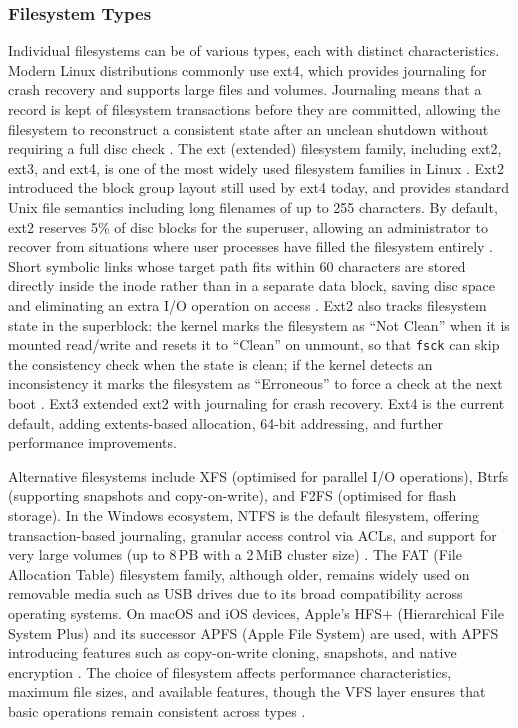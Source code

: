 \subsubsection{Filesystem Types}
\label{FilesystemTypes}

Individual filesystems can be of various types, each with distinct characteristics. Modern Linux distributions commonly use ext4, which provides journaling for crash recovery and supports large files and volumes. Journaling means that a record is kept of filesystem transactions before they are committed, allowing the filesystem to reconstruct a consistent state after an unclean shutdown without requiring a full disc check \parencite{LinuxSAGFilesystems}. The ext (extended) filesystem family, including ext2, ext3, and ext4, is one of the most widely used filesystem families in Linux \parencite{TLDPFilesystems}. Ext2 introduced the block group layout still used by ext4 today, and provides standard Unix file semantics including long filenames of up to 255 characters. By default, ext2 reserves 5\% of disc blocks for the superuser, allowing an administrator to recover from situations where user processes have filled the filesystem entirely \parencite{TLDPFilesystems}. Short symbolic links whose target path fits within 60 characters are stored directly inside the inode rather than in a separate data block, saving disc space and eliminating an extra I/O operation on access \parencite{TLDPFilesystems}. Ext2 also tracks filesystem state in the superblock: the kernel marks the filesystem as ``Not Clean'' when it is mounted read/write and resets it to ``Clean'' on unmount, so that \texttt{fsck} can skip the consistency check when the state is clean; if the kernel detects an inconsistency it marks the filesystem as ``Erroneous'' to force a check at the next boot \parencite{TLDPFilesystems}. Ext3 extended ext2 with journaling for crash recovery. Ext4 is the current default, adding extents-based allocation, 64-bit addressing, and further performance improvements.

Alternative filesystems include XFS (optimised for parallel I/O operations), Btrfs (supporting snapshots and copy-on-write), and F2FS (optimised for flash storage). In the Windows ecosystem, NTFS is the default filesystem, offering transaction-based journaling, granular access control via ACLs, and support for very large volumes (up to 8\,PB with a 2\,MiB cluster size) \parencite{MicrosoftNTFS}. The FAT (File Allocation Table) filesystem family, although older, remains widely used on removable media such as USB drives due to its broad compatibility across operating systems. On macOS and iOS devices, Apple's HFS+ (Hierarchical File System Plus) and its successor APFS (Apple File System) are used, with APFS introducing features such as copy-on-write cloning, snapshots, and native encryption \parencite{GFGOSFileSystems}. The choice of filesystem affects performance characteristics, maximum file sizes, and available features, though the VFS layer ensures that basic operations remain consistent across types \parencite{KernelFilesystems}.

